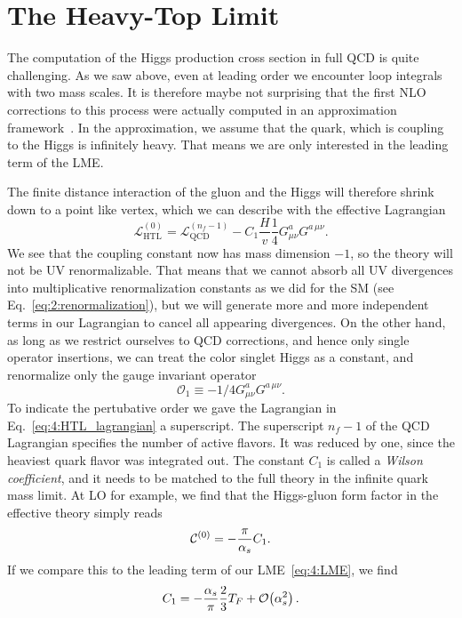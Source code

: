 \section{The Heavy-Top Limit} \label{sec:4:HTL}
The computation of the Higgs production cross section in full \acs{QCD} is quite challenging. As we saw above, even at leading order we encounter loop integrals with two mass scales. It is therefore maybe not surprising that the first \acs{NLO} corrections to this process were actually computed in an approximation framework~\cite{Dawson:1990zj}. In the approximation, we assume that the quark, which is coupling to the Higgs is infinitely heavy. That means we are only interested in the leading term of the \acs{LME}.

The finite distance interaction of the gluon and the Higgs will therefore shrink down to a point like vertex, which we can describe with the effective Lagrangian
\begin{equation}
\mathcal{L}_{\text{HTL}}^{(0)} = \mathcal{L}_{\text{QCD}}^{(n_f - 1)} - C_1 \frac{H}{v} \frac{1}{4} G^a_{\mu \nu} G^{a\, \mu\nu}.
\label{eq:4:HTL_lagrangian}
\end{equation}
We see that the coupling constant now has mass dimension $-1$, so the theory will not be \acs{UV} renormalizable. That means that we cannot absorb all \acs{UV} divergences into multiplicative renormalization constants as we did for the \acs{SM} (see Eq.~\eqref{eq:2:renormalization}), but we will generate more and more independent terms in our Lagrangian to cancel all appearing divergences. On the other hand, as long as we restrict ourselves to \acs{QCD} corrections, and hence only single operator insertions, we can treat the color singlet Higgs as a constant, and renormalize only the gauge invariant operator
\begin{equation}
\mathcal{O}_1 \equiv - 1/4 G_{\mu\nu}^a G^{a\, \mu\nu}.
\end{equation}
To indicate the pertubative order we gave the Lagrangian in Eq.~\eqref{eq:4:HTL_lagrangian} a superscript. The superscript $n_f - 1$ of the QCD Lagrangian specifies the number of active flavors. It was reduced by one, since the heaviest quark flavor was integrated out. The constant $C_1$ is called a \textit{Wilson coefficient}, and it needs to be matched to the full theory in the infinite quark mass limit. At \acs{LO} for example, we find that the Higgs-gluon form factor in the effective theory simply reads
\begin{equation}
 \mathcal{C}^{(0)} = - \frac{\pi}{\alpha_s}C_1.
\end{equation}
If we compare this to the leading term of our \acs{LME}~\eqref{eq:4:LME}, we find
\begin{equation}
C_1 = -\frac{\alpha_s}{\pi} \frac{2}{3} T_F + \mathcal{O}\!\left(\alpha_s^2\right).
\end{equation}


